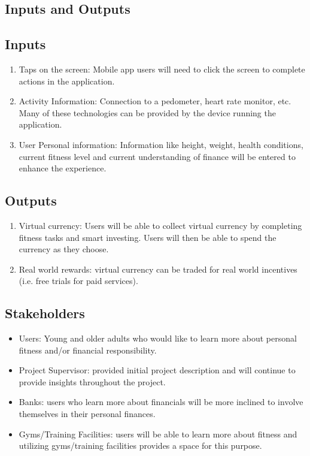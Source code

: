 \documentclass{article}
\begin{document}
\subsection{Inputs and Outputs}

\subsection{Inputs}
\begin{enumerate}
    \item Taps on the screen: Mobile app users will need to click the screen to complete actions in the application.
    \item Activity Information: Connection to a pedometer, heart rate monitor, etc. 
        Many of these technologies can be provided by the device running the application.
    \item User Personal information: Information like height, weight, health conditions, current fitness level and current understanding of finance will be entered to enhance the experience.
\end{enumerate}
\subsection{Outputs}
\begin{enumerate}
    \item Virtual currency: Users will be able to collect virtual currency by completing fitness tasks and smart investing. Users will then be able to spend the currency as they choose. 
    \item Real world rewards: virtual currency can be traded for real world incentives (i.e. free trials for paid services).
\end{enumerate}

\subsection{Stakeholders}
\begin{itemize}
    \item Users: Young and older adults who would like to learn more about personal fitness and/or financial responsibility.
    \item Project Supervisor: provided initial project description and will continue to provide insights throughout the project.
    \item Banks: users who learn more about financials will be more inclined to involve themselves  in their personal finances.
    \item Gyms/Training Facilities: users will be able to learn more about fitness and utilizing gyms/training facilities provides a space for this purpose.
\end{itemize}
\end{document}
